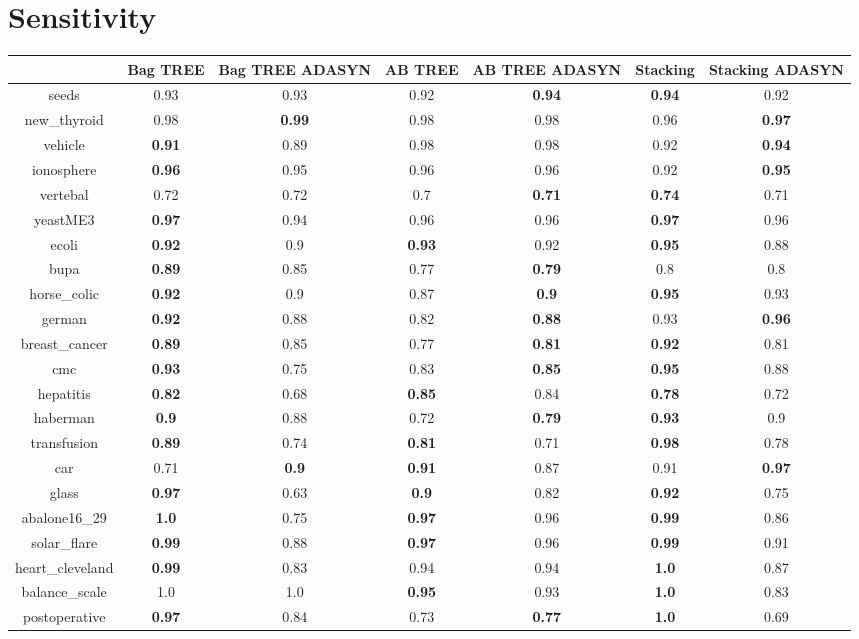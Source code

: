 \documentclass{article}%
\begin{document}
%
\section*{Sensitivity}%
\begin{tabular}{c|cccccc}%
&Bag TREE&Bag TREE ADASYN&AB TREE&AB TREE ADASYN&Stacking&Stacking ADASYN\\%
\hline%
seeds&0.93&0.93&0.92&\textbf{0.94}&\textbf{0.94}&0.92\\%
new\_thyroid&0.98&\textbf{0.99}&0.98&0.98&0.96&\textbf{0.97}\\%
vehicle&\textbf{0.91}&0.89&0.98&0.98&0.92&\textbf{0.94}\\%
ionosphere&\textbf{0.96}&0.95&0.96&0.96&0.92&\textbf{0.95}\\%
vertebal&0.72&0.72&0.7&\textbf{0.71}&\textbf{0.74}&0.71\\%
yeastME3&\textbf{0.97}&0.94&0.96&0.96&\textbf{0.97}&0.96\\%
ecoli&\textbf{0.92}&0.9&\textbf{0.93}&0.92&\textbf{0.95}&0.88\\%
bupa&\textbf{0.89}&0.85&0.77&\textbf{0.79}&0.8&0.8\\%
horse\_colic&\textbf{0.92}&0.9&0.87&\textbf{0.9}&\textbf{0.95}&0.93\\%
german&\textbf{0.92}&0.88&0.82&\textbf{0.88}&0.93&\textbf{0.96}\\%
breast\_cancer&\textbf{0.89}&0.85&0.77&\textbf{0.81}&\textbf{0.92}&0.81\\%
cmc&\textbf{0.93}&0.75&0.83&\textbf{0.85}&\textbf{0.95}&0.88\\%
hepatitis&\textbf{0.82}&0.68&\textbf{0.85}&0.84&\textbf{0.78}&0.72\\%
haberman&\textbf{0.9}&0.88&0.72&\textbf{0.79}&\textbf{0.93}&0.9\\%
transfusion&\textbf{0.89}&0.74&\textbf{0.81}&0.71&\textbf{0.98}&0.78\\%
car&0.71&\textbf{0.9}&\textbf{0.91}&0.87&0.91&\textbf{0.97}\\%
glass&\textbf{0.97}&0.63&\textbf{0.9}&0.82&\textbf{0.92}&0.75\\%
abalone16\_29&\textbf{1.0}&0.75&\textbf{0.97}&0.96&\textbf{0.99}&0.86\\%
solar\_flare&\textbf{0.99}&0.88&\textbf{0.97}&0.96&\textbf{0.99}&0.91\\%
heart\_cleveland&\textbf{0.99}&0.83&0.94&0.94&\textbf{1.0}&0.87\\%
balance\_scale&1.0&1.0&\textbf{0.95}&0.93&\textbf{1.0}&0.83\\%
postoperative&\textbf{0.97}&0.84&0.73&\textbf{0.77}&\textbf{1.0}&0.69\\%
\end{tabular}
\end{document}
